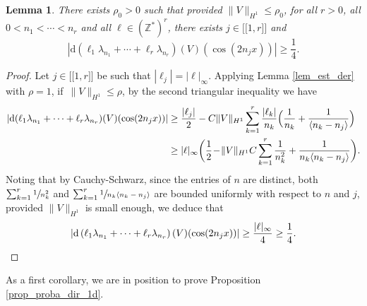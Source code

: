 \documentclass[11pt]{article}
\newcommand{\llbracket}{\mathopen{[\!\![}}
\newcommand{\rrbracket}{\mathclose{]\!\!]}}
\newtheorem{lemma}[theorem]{Lemma}
\theoremstyle{definition}
\begin{document}
\begin{lemma} \label{lem_14}There exists $\rho_0>0$ such that provided $\|V\|_{H^1}\leq \rho_0$, for all $r>0$, all $0<n_1<\cdots<n_{r}$ and all $\ell\in (\mathbb{Z}^*)^{r}$, there exists $j\in \llbracket 1,r \rrbracket$ and
\[
|\mathrm{d}\left(\ell_1 \lambda_{n_1}+\cdots+\ell_r \lambda_{n_r} \right)(V)(\cos(2n_jx))| \geq \frac14.
\]
\end{lemma}
\begin{proof}
Let $j \in \llbracket 1,r \rrbracket$ be such that $|\ell_j|=|\ell|_\infty$. Applying Lemma \ref{lem_est_der} with $\rho=1$, if~$\|V\|_{H^1}\leq \rho$, by the second triangular inequality we have
\begin{equation*}
\begin{split}
|\mathrm{d}(\ell_1 \lambda_{n_1}+\cdots+\ell_r \lambda_{n_r})(V)(\cos(2n_jx))|
&\geq \frac{|\ell_j|}2 -C \|V\|_{H^1} \sum_{k=1}^{r} \frac{|\ell_k|}{n_k} \Bigl(\frac{1}{n_k} + \frac1{\langle n_k-n_j \rangle} \Bigr) \\
&\geq |\ell|_\infty \biggl(\frac12 \!-\! \|V\|_{H^1} C \sum_{k=1}^{r} \frac{1}{n_k^2} + \frac1{n_k\langle n_k-n_j \rangle} \biggr).
\end{split}
\end{equation*}
Noting that by Cauchy-Schwarz, since the entries of $n$ are distinct, both $\sum_{k=1}^{r} \sfrac{1}{n_k^2}$ and $\sum_{k=1}^{r} \sfrac1{n_k\langle n_k-n_j \rangle}$ are bounded uniformly with respect to $n$ and $j$, provided $\|V\|_{H^1}$ is small enough, we deduce that
\[
|\mathrm{d}\left(\ell_1 \lambda_{n_1}+\cdots+\ell_r \lambda_{n_r} \right)(V)(\cos(2n_jx))| \geq \frac{|\ell|_\infty}4 \geq \frac14.\qedhere
\]
\end{proof}
As a first corollary, we are in position to prove Proposition \ref{prop_proba_dir_1d}.
\end{document}

